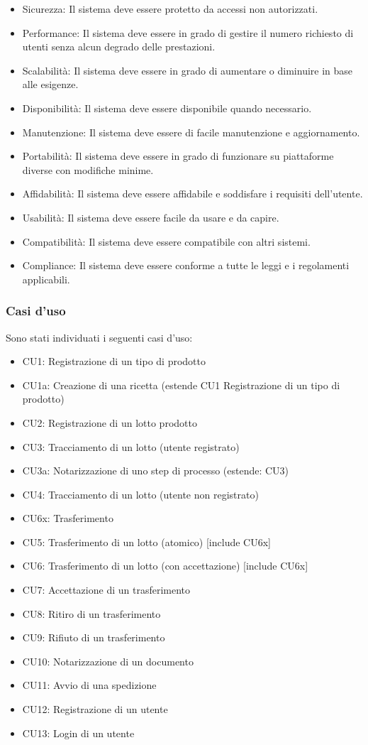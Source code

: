 \documentclass[a4paper,11pt]{article}
\begin{document}
\begin{itemize}
  \item Sicurezza: Il sistema deve essere protetto da accessi non autorizzati.
  \item Performance: Il sistema deve essere in grado di gestire il numero richiesto di utenti senza alcun degrado delle prestazioni.
  \item Scalabilità: Il sistema deve essere in grado di aumentare o diminuire in base alle esigenze.
  \item Disponibilità: Il sistema deve essere disponibile quando necessario.
  \item Manutenzione: Il sistema deve essere di facile manutenzione e aggiornamento.
  \item Portabilità: Il sistema deve essere in grado di funzionare su piattaforme diverse con modifiche minime.
  \item Affidabilità: Il sistema deve essere affidabile e soddisfare i requisiti dell'utente.
  \item Usabilità: Il sistema deve essere facile da usare e da capire.
  \item Compatibilità: Il sistema deve essere compatibile con altri sistemi.
  \item Compliance: Il sistema deve essere conforme a tutte le leggi e i regolamenti applicabili.
\end{itemize}

\subsubsection{Casi d'uso}
Sono stati individuati i seguenti casi d'uso:

\begin{itemize}
  \item CU1: Registrazione di un tipo di prodotto
  \item CU1a: Creazione di una ricetta (estende CU1 Registrazione di un tipo di prodotto)
  \item CU2: Registrazione di un lotto prodotto
  \item CU3: Tracciamento di un lotto (utente registrato)
  \item CU3a: Notarizzazione di uno step di processo (estende: CU3)
  \item CU4: Tracciamento di un lotto (utente non registrato)
  \item CU6x: Trasferimento
  \item CU5: Trasferimento di un lotto (atomico) [include CU6x]
  \item CU6: Trasferimento di un lotto (con accettazione) [include CU6x]
  \item CU7: Accettazione di un trasferimento
  \item CU8: Ritiro di un trasferimento
  \item CU9: Rifiuto di un trasferimento
  \item CU10: Notarizzazione di un documento
  \item CU11: Avvio di una spedizione
  \item CU12: Registrazione di un utente
  \item CU13: Login di un utente
\end{itemize}
\end{document}
